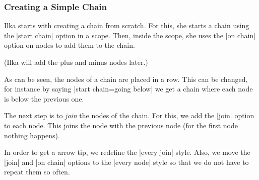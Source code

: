 \subsubsection{Creating a Simple Chain}


Ilka starts with creating a chain from scratch. For this, she starts a
chain using the |start chain| option in a scope. Then, inside the
scope, she uses the |on chain| option on nodes to add them to the
chain.
\begin{codeexample}[]
\end{codeexample}
(Ilka will add the plus and minus nodes later.)

As can be seen, the nodes of a chain are placed in a row. This can be
changed, for instance by saying |start chain=going below| we get a
chain where each node is below the previous one.

The next step is to \emph{join} the nodes of the chain. For this, we
add the |join| option to each node. This joins the node with the
previous node (for the first node nothing happens).
\begin{codeexample}[]
\end{codeexample}
In order to get a arrow tip, we redefine the |every join| style. Also,
we move the |join| and |on chain| options to the |every node|
style so that we do not have to repeat them so often.
\begin{codeexample}[]
\end{codeexample}


